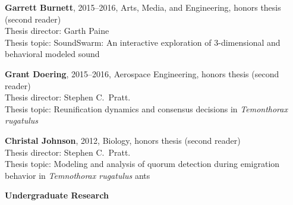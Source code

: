 \documentclass[10pt]{article}           %
\newcommand{\blankline}{\quad\pagebreak[3]}
\begin{document}
\begin{outerlist}
    \item \textbf{Garrett Burnett}, 2015--2016, Arts, Media, and Engineering, honors thesis (second reader)\\
        Thesis director: Garth Paine\\
        Thesis topic: SoundSwarm: An interactive exploration of
        3-dimensional and behavioral modeled sound

    \item \textbf{Grant Doering}, 2015--2016, Aerospace Engineering, honors thesis (second reader)\\
        Thesis director: Stephen C.~Pratt.\\
        Thesis topic: Reunification dynamics and consensus decisions in \emph{Temonthorax rugatulus}

    \item \textbf{Christal Johnson}, 2012, Biology, honors thesis (second reader)\\
        Thesis director: Stephen C.~Pratt.\\
        Thesis topic: Modeling and analysis of quorum detection during
        emigration behavior in \emph{Temnothorax rugatulus} ants

\end{outerlist}

\blankline

\textbf{Undergraduate Research}
\end{document}
